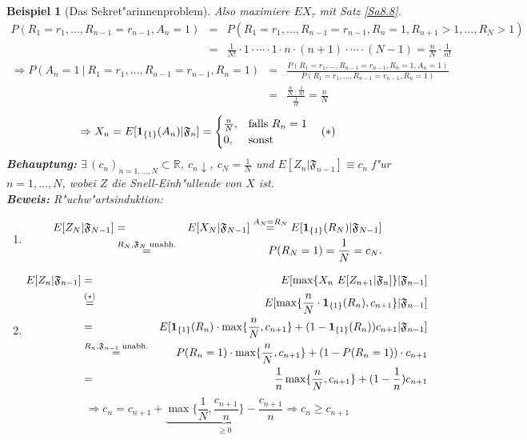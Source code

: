 \documentclass[a4paper,11pt]{scrbook}
\newcommand{\R}{{\mathbb R}}
\newcommand{\ind}{\text{\bf{1}}}
\def\FF{ \mathfrak{F} }
\newtheorem{Bsp}{Beispiel}[chapter]
\theoremstyle{nonumberplain}
\begin{document}
\begin{Bsp}[Das Sekret"arinnenproblem]
Also maximiere $EX_{\tau}$ mit Satz \ref{Sa8.8}.
\begin{eqnarray*}
P(R_1 = r_1,\dots,R_{n-1} = r_{n-1}, A_n = 1) & = & P(R_1 = r_1,\dots,R_{n-1}=r_{n-1}, R_n = 1, R_{n+1}>1,\dots,R_N>1) \\
& = & \frac1{N!} \cdot 1 \cdot \cdots \cdot 1 \cdot n \cdot (n+1) \cdot \cdots \cdot (N-1) = \frac{n}{N} \cdot \frac1{n!}
\end{eqnarray*}
\begin{eqnarray*}
\Rightarrow P(A_n = 1\ |\ R_1 = r_1,\dots,R_{n-1} = r_{n-1},R_n = 1) & = & \frac{P(R_1=r_1,\dots,R_{n-1}=r_{n-1},R_n=1,A_n=1)}{P(R_1=r_1,\dots,R_{n-1}=r_{n-1},R_n=1)} \\
& = & \frac{\frac{n}{N} \cdot \frac1{n!}}{\frac1{n!}} = \frac{n}{N}
\end{eqnarray*}
\[
\Rightarrow X_n = E[\ind_{\{1\}}(A_n)|\FF_n] = \begin{cases}
\frac{n}{N}, & \text{falls } R_n = 1 \\
0, & \text{sonst}
\end{cases} \quad (\ast)
\]
\textbf{Behauptung:} $\exists\, (c_n)_{n=1,\dots,N} \subset \R$, $c_n\downarrow$, $c_N = \frac1{N}$ und $E[Z_n|\FF_{n-1}] \equiv c_n$ f"ur $n=1,\dots,N$, wobei $Z$ die Snell-Einh"ullende von $X$ ist.\\
\textbf{Beweis:} R"uchw"artsinduktion:
\begin{enumerate}
\item[$n=N$:]
\begin{eqnarray*}
E[Z_N|\FF_{N-1}] & = & E[X_N|\FF_{N-1}] \stackrel{A_N=R_N}{=} E[\ind_{\{1\}}(R_N)|\FF_{N-1}] \\
& \stackrel{R_N,\FF_N \text{ unabh.}}{=} & P(R_N = 1) = \frac1{N} = c_N.
\end{eqnarray*}

\item[$n+1 \leadsto n$:]
\begin{eqnarray*}
E[Z_n|\FF_{n-1}] & = & E[\max\{X_n\ E[Z_{n+1}|\FF_n]\}|\FF_{n-1}] \\
& \stackrel{(\ast)}{=} & E[\max\{\frac{n}{N} \cdot \ind_{\{1\}}(R_n), c_{n+1}\}|\FF_{n-1}] \\
& = & E[\ind_{\{1\}}(R_n) \cdot \max\{ \frac{n}{N}, c_{n+1}\} + (1-\ind_{\{1\}}(R_n))c_{n+1} | \FF_{n-1}] \\
& \stackrel{R_n,\FF_{n-1} \text{ unabh.}}{=} & P(R_n=1) \cdot \max\{\frac{n}{N}, c_{n+1}\} + (1-P(R_n=1))\cdot c_{n+1} \\
& = & \frac1{n} \max\{\frac{n}{N}, c_{n+1}\} + (1-\frac1{n})c_{n+1}
\end{eqnarray*}
\[
\Rightarrow c_n = c_{n+1} + \underbrace{ \max\{ \frac1{N}, \frac{c_{n+1}}{n}\} - \frac{c_{n+1}}{n} }_{\geq 0} \Rightarrow c_n \geq c_{n+1}
\]
\end{enumerate}


\end{Bsp}
\end{document}
